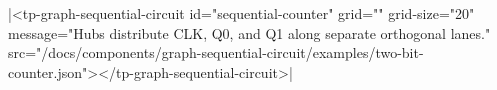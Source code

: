 \documentclass{article}
\begin{document}
\rawhtml|<tp-graph-sequential-circuit id="sequential-counter" grid="" grid-size="20" message="Hubs distribute CLK, Q0, and Q1 along separate orthogonal lanes." src="/docs/components/graph-sequential-circuit/examples/two-bit-counter.json"></tp-graph-sequential-circuit>|
\end{document}

